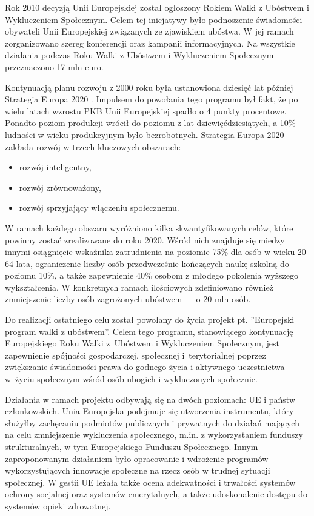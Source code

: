 Rok 2010 decyzją Unii Europejskiej został ogłoszony Rokiem Walki z Ubóstwem i Wykluczeniem Społecznym. Celem tej inicjatywy było podnoszenie świadomości obywateli Unii Europejskiej związanych ze zjawiskiem ubóstwa. W jej ramach zorganizowano szereg konferencji oraz kampanii informacyjnych. Na wszystkie działania podczas Roku Walki z Ubóstwem i Wykluczeniem Społecznym przeznaczono 17 mln euro.

Kontynuacją planu rozwoju z 2000 roku była ustanowiona dziesięć lat później Strategia Europa 2020 \citep{ke2010}. Impulsem do powołania tego programu był fakt, że po wielu latach wzrostu PKB Unii Europejskiej spadło o 4 punkty procentowe. Ponadto poziom produkcji wrócił do poziomu z lat dziewięćdziesiątych, a 10\% ludności w wieku produkcyjnym było bezrobotnych. Strategia Europa 2020 zakłada rozwój w trzech kluczowych obszarach:

\begin{itemize}
\item rozwój inteligentny,
\item rozwój zrównoważony,
\item rozwój sprzyjający włączeniu społecznemu.
\end{itemize}

W ramach każdego obszaru wyróżniono kilka skwantyfikowanych celów, które powinny zostać zrealizowane do roku 2020. Wśród nich znajduje się miedzy innymi osiągnięcie wskaźnika zatrudnienia na poziomie 75\% dla osób w wieku 20-64 lata, ograniczenie liczby osób przedwcześnie kończących naukę szkolną do poziomu 10\%, a także zapewnienie 40\% osobom z młodego pokolenia wyższego wykształcenia. W konkretnych ramach ilościowych zdefiniowano również zmniejszenie liczby osób zagrożonych ubóstwem --- o 20 mln osób.

Do realizacji ostatniego celu został powołany do życia projekt pt. ''Europejski program walki z ubóstwem''. Celem tego programu, stanowiącego kontynuację Europejskiego Roku Walki z~Ubóstwem i Wykluczeniem Społecznym, jest zapewnienie spójności gospodarczej, społecznej i~terytorialnej poprzez zwiększanie świadomości prawa do godnego życia i aktywnego uczestnictwa w~życiu społecznym wśród osób ubogich i wykluczonych społecznie.

Działania w ramach projektu odbywają się na dwóch poziomach: UE i państw członkowskich. Unia Europejska podejmuje się utworzenia instrumentu, który służyłby zachęcaniu podmiotów publicznych i prywatnych do działań mających na celu zmniejszenie wykluczenia społecznego, m.in. z wykorzystaniem funduszy strukturalnych, w tym Europejskiego Funduszu Społecznego. Innym zaproponowanym działaniem było opracowanie i wdrożenie programów wykorzystujących innowacje społeczne na rzecz osób w trudnej sytuacji społecznej. W gestii UE leżała także ocena adekwatności i trwałości systemów ochrony socjalnej oraz systemów emerytalnych, a także udoskonalenie dostępu do systemów opieki zdrowotnej.

